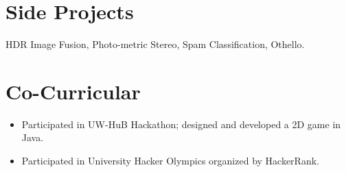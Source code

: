\documentclass[margin]{res}
\begin{document}
\begin{resume}
\section{Side Projects}
HDR Image Fusion, Photo-metric Stereo, Spam Classification, Othello.
\section{Co-Curricular}
\begin{itemize} \itemsep -2pt  %
 \item Participated in UW-HuB Hackathon; designed and developed a 2D game in Java.
 \item Participated in University Hacker Olympics organized by HackerRank.
 \end{itemize}



\end{resume} 
\end{document}
